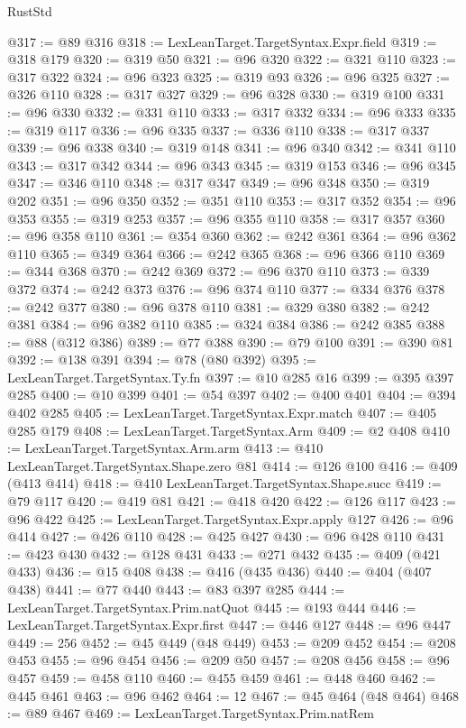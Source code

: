 \begin{lexlean}{RustStd}
\begin{coremodule}
{\begin{coremodule}
{{{{{{{{{{{{{{{{{{{{{{{{{{{{{{{{{{{{{{{{{{{{{{{{{{{{{{{{{{{{@317 := @89 @316
@318 := LexLeanTarget.TargetSyntax.Expr.field
@319 := @318 @179
@320 := @319 @50
@321 := @96 @320
@322 := @321 @110
@323 := @317 @322
@324 := @96 @323
@325 := @319 @93
@326 := @96 @325
@327 := @326 @110
@328 := @317 @327
@329 := @96 @328
@330 := @319 @100
@331 := @96 @330
@332 := @331 @110
@333 := @317 @332
@334 := @96 @333
@335 := @319 @117
@336 := @96 @335
@337 := @336 @110
@338 := @317 @337
@339 := @96 @338
@340 := @319 @148
@341 := @96 @340
@342 := @341 @110
@343 := @317 @342
@344 := @96 @343
@345 := @319 @153
@346 := @96 @345
@347 := @346 @110
@348 := @317 @347
@349 := @96 @348
@350 := @319 @202
@351 := @96 @350
@352 := @351 @110
@353 := @317 @352
@354 := @96 @353
@355 := @319 @253
@357 := @96 @355 @110
@358 := @317 @357
@360 := @96 @358 @110
@361 := @354 @360
@362 := @242 @361
@364 := @96 @362 @110
@365 := @349 @364
@366 := @242 @365
@368 := @96 @366 @110
@369 := @344 @368
@370 := @242 @369
@372 := @96 @370 @110
@373 := @339 @372
@374 := @242 @373
@376 := @96 @374 @110
@377 := @334 @376
@378 := @242 @377
@380 := @96 @378 @110
@381 := @329 @380
@382 := @242 @381
@384 := @96 @382 @110
@385 := @324 @384
@386 := @242 @385
@388 := @88 (@312 @386)
@389 := @77 @388
@390 := @79 @100
@391 := @390 @81
@392 := @138 @391
@394 := @78 (@80 @392)
@395 := LexLeanTarget.TargetSyntax.Ty.fn
@397 := @10 @285 @16
@399 := @395 @397 @285
@400 := @10 @399
@401 := @54 @397
@402 := @400 @401
@404 := @394 @402 @285
@405 := LexLeanTarget.TargetSyntax.Expr.match
@407 := @405 @285 @179
@408 := LexLeanTarget.TargetSyntax.Arm
@409 := @2 @408
@410 := LexLeanTarget.TargetSyntax.Arm.arm
@413 := @410 LexLeanTarget.TargetSyntax.Shape.zero @81
@414 := @126 @100
@416 := @409 (@413 @414)
@418 := @410 LexLeanTarget.TargetSyntax.Shape.succ
@419 := @79 @117
@420 := @419 @81
@421 := @418 @420
@422 := @126 @117
@423 := @96 @422
@425 := LexLeanTarget.TargetSyntax.Expr.apply @127
@426 := @96 @414
@427 := @426 @110
@428 := @425 @427
@430 := @96 @428 @110
@431 := @423 @430
@432 := @128 @431
@433 := @271 @432
@435 := @409 (@421 @433)
@436 := @15 @408
@438 := @416 (@435 @436)
@440 := @404 (@407 @438)
@441 := @77 @440
@443 := @83 @397 @285
@444 := LexLeanTarget.TargetSyntax.Prim.natQuot
@445 := @193 @444
@446 := LexLeanTarget.TargetSyntax.Expr.first
@447 := @446 @127
@448 := @96 @447
@449 := 256
@452 := @45 @449 (@48 @449)
@453 := @209 @452
@454 := @208 @453
@455 := @96 @454
@456 := @209 @50
@457 := @208 @456
@458 := @96 @457
@459 := @458 @110
@460 := @455 @459
@461 := @448 @460
@462 := @445 @461
@463 := @96 @462
@464 := 12
@467 := @45 @464 (@48 @464)
@468 := @89 @467
@469 := LexLeanTarget.TargetSyntax.Prim.natRem
}}}}}}}}}}}}}}}}}}}}}}}}}}}}}}}}}}}}}}}}}}}}}}}}}}}}}}}}}}}}
\end{coremodule}}
\end{coremodule}
\end{lexlean}
